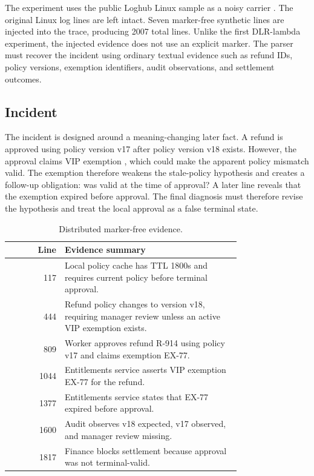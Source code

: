 \documentclass[11pt]{article}
\newcommand{\code}[1]{\texttt{\detokenize{#1}}}
\begin{document}
The experiment uses the public Loghub Linux sample as a noisy carrier
\cite{loghub_repo,loghub_issre,loghub2_issta}. The original Linux log lines are
left intact. Seven marker-free synthetic lines are injected into the trace,
producing 2007 total lines. Unlike the first DLR-lambda experiment, the
injected evidence does not use an explicit \code{DLR_LAMBDA} marker. The parser
must recover the incident using ordinary textual evidence such as refund IDs,
policy versions, exemption identifiers, audit observations, and settlement
outcomes.

\subsection{Incident}

The incident is designed around a meaning-changing later fact. A refund is
approved using policy version v17 after policy version v18 exists. However, the
approval claims VIP exemption \code{EX-77}, which could make the apparent
policy mismatch valid. The exemption therefore weakens the stale-policy
hypothesis and creates a follow-up obligation: was \code{EX-77} valid at the
time of approval? A later line reveals that the exemption expired before
approval. The final diagnosis must therefore revise the hypothesis and treat the
local approval as a false terminal state.

\begin{table}[h]
\centering
\caption{Distributed marker-free evidence.}
\label{tab:evidence}
\small
\begin{tabular}{r p{0.76\linewidth}}
\toprule
Line & Evidence summary \\
\midrule
117 & Local policy cache has TTL 1800s and requires current policy before terminal approval. \\
444 & Refund policy changes to version v18, requiring manager review unless an active VIP exemption exists. \\
809 & Worker approves refund R-914 using policy v17 and claims exemption EX-77. \\
1044 & Entitlements service asserts VIP exemption EX-77 for the refund. \\
1377 & Entitlements service states that EX-77 expired before approval. \\
1600 & Audit observes v18 expected, v17 observed, and manager review missing. \\
1817 & Finance blocks settlement because approval was not terminal-valid. \\
\bottomrule
\end{tabular}
\end{table}
\end{document}
